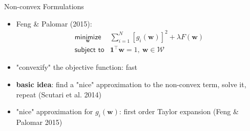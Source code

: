 \documentclass{beamer}
\begin{document}
        \begin{frame}{Non-convex Formulations}
            \vspace{.5cm}
          \begin{itemize}
            \item Feng \& Palomar (2015):
              \begin{equation*}
              \begin{array}{ll}
                \underset{\bm{w}}{\textsf{minimize}} &
                \sum_{i=1}^{N}\left[g_{i}(\bm{w})\right]^2 + \lambda F(\bm{w})\\
                \textsf{subject to} & \mathbf{1}^\top\bm{w} = 1, ~\bm{w} \in \mathcal{W}
              \end{array}
              \end{equation*}
            \end{itemize}
            \begin{itemize}
            \pause
            \item "convexify" the objective function: fast \Laughey
            \vspace{.25cm}
            \pause
            \item \textbf{basic idea}: find a "nice" approximation to the non-convex term, solve it, repeat (Scutari et al. 2014)
            \vspace{.25cm}
            \pause
            \item "nice" approximation for $g_i(\bm{w})$: first order Taylor expansion (Feng \& Palomar 2015)
          \end{itemize}
        \end{frame}
\end{document}
